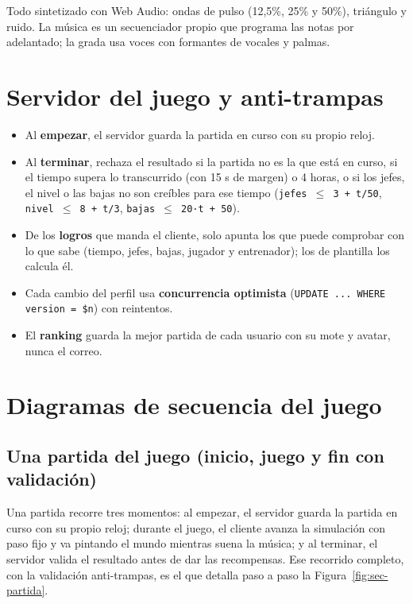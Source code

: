 Todo sintetizado con Web Audio: ondas de pulso (12,5\%, 25\% y 50\%), triángulo y ruido. La música es un secuenciador propio que programa las notas por adelantado; la grada usa voces con formantes de vocales y palmas.

\section{Servidor del juego y anti-trampas}
\label{sec:juego-servidor}

\begin{itemize}
    \item Al \textbf{empezar}, el servidor guarda la partida en curso con su propio reloj.
    \item Al \textbf{terminar}, rechaza el resultado si la partida no es la que está en curso, si el tiempo supera lo transcurrido (con 15 s de margen) o 4 horas, o si los jefes, el nivel o las bajas no son creíbles para ese tiempo (\texttt{jefes $\leq$ 3 + t/50}, \texttt{nivel $\leq$ 8 + t/3}, \texttt{bajas $\leq$ 20·t + 50}).
    \item De los \textbf{logros} que manda el cliente, solo apunta los que puede comprobar con lo que sabe (tiempo, jefes, bajas, jugador y entrenador); los de plantilla los calcula él.
    \item Cada cambio del perfil usa \textbf{concurrencia optimista} (\texttt{UPDATE ... WHERE version = \$n}) con reintentos.
    \item El \textbf{ranking} guarda la mejor partida de cada usuario con su mote y avatar, nunca el correo.
\end{itemize}

\section{Diagramas de secuencia del juego}
\label{sec:juego-secuencias}

\subsection{Una partida del juego (inicio, juego y fin con validación)}
\label{sec:juego-partida-seq}

Una partida recorre tres momentos: al empezar, el servidor guarda la partida en curso con su propio reloj; durante el juego, el cliente avanza la simulación con paso fijo y va pintando el mundo mientras suena la música; y al terminar, el servidor valida el resultado antes de dar las recompensas. Ese recorrido completo, con la validación anti-trampas, es el que detalla paso a paso la Figura~\ref{fig:sec-partida}.

